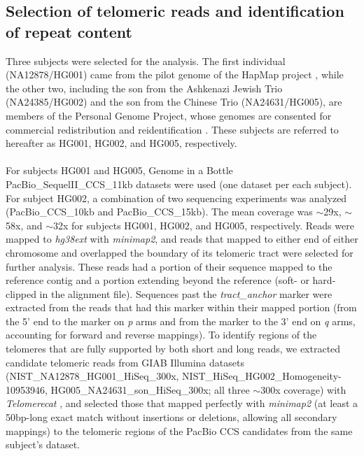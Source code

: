 \documentclass{article}
\begin{document}
\subsection*{Selection of telomeric reads and identification of repeat content}
Three subjects were selected for the analysis.
The first individual (NA12878/HG001) came from the pilot genome of the HapMap project \cite{HG001}, while the other two, including the son from the Ashkenazi Jewish Trio (NA24385/HG002) and the son from the Chinese Trio (NA24631/HG005), are members of the Personal Genome Project, whose genomes are consented for commercial redistribution and reidentification \cite{HG00X}.
These subjects are referred to hereafter as HG001, HG002, and HG005, respectively.
\\~\\
For subjects HG001 and HG005, Genome in a Bottle \cite{giab} PacBio\_SequelII\_CCS\_11kb datasets were used (one dataset per each subject).
For subject HG002, a combination of two sequencing experiments was analyzed (PacBio\_CCS\_10kb and PacBio\_CCS\_15kb).
The mean coverage was $\sim$29x, $\sim$58x, and $\sim$32x for subjects HG001, HG002, and HG005, respectively.
Reads were mapped to \textit{hg38ext} with \textit{minimap2}, and reads that mapped to either end of either chromosome and overlapped the boundary of its telomeric tract were selected for further analysis.
These reads had a portion of their sequence mapped to the reference contig and a portion extending beyond the reference (soft- or hard-clipped in the alignment file).
Sequences past the \textit{tract\_anchor} marker were extracted from the reads that had this marker within their mapped portion (from the 5' end to the marker on \textit{p} arms and from the marker to the 3' end on \textit{q} arms, accounting for forward and reverse mappings).
To identify regions of the telomeres that are fully supported by both short and long reads, we extracted candidate telomeric reads from GIAB Illumina datasets
   (NIST\_NA12878\_HG001\_HiSeq\_300x,
    NIST\_HiSeq\_HG002\_Homogeneity-10953946,
    HG005\_NA24631\_son\_HiSeq\_300x;
    all three $\sim$300x coverage)
with \textit{Telomerecat} \cite{telomerecat}, and selected those that mapped perfectly with \textit{minimap2} (at least a 50bp-long exact match without insertions or deletions, allowing all secondary mappings) to the telomeric regions of the PacBio CCS candidates from the same subject's dataset.
\\~\\
\end{document}

